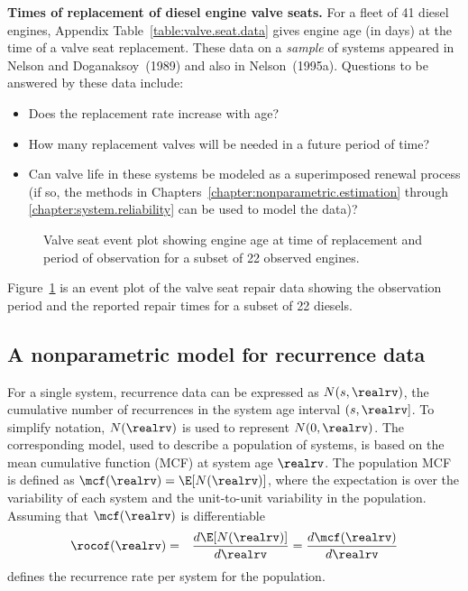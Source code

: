 \begin{example}
\label{example:valve.seat.data}
{\bf Times of replacement of diesel engine valve seats.}
For a fleet of 41 diesel engines,
Appendix Table~\ref{table:valve.seat.data} gives engine age
(in days) at the time of a valve seat replacement.
These data on a {\em sample} of systems appeared
in Nelson and Doganaksoy~(1989) and also in Nelson~(1995a).
Questions to be answered by these data include:
\begin{itemize}
\item
Does the replacement rate increase with age?
\item
How many replacement valves will be needed in a future period of time?
\item
Can valve life in these systems be modeled as a 
superimposed renewal process (if so,
the methods in Chapters~\ref{chapter:nonparametric.estimation}
through \ref{chapter:system.reliability} can be used to model the data)?
\end{itemize}
\begin{figure}
\caption{Valve seat event plot showing engine age at time of replacement
and period of observation for a subset of 22 observed engines.}
\label{figure:valveseat.event.plot.ps}
\end{figure}
Figure~\ref{figure:valveseat.event.plot.ps} is an event plot of the
valve seat repair data showing the observation period and the reported
repair times for a subset of 22 diesels.
\end{example}

\subsection{A nonparametric model for recurrence data}

For a single system, recurrence data can be expressed as
$N(s, \realrv)$, the cumulative number of 
recurrences in the system age interval $(s, \realrv]$. To simplify notation,
$N(\realrv)$ is used to represent $N(0,\realrv)$. 
The corresponding model, used to describe a population
of systems, is based on the mean cumulative function (MCF) at system age
$\realrv$. The population MCF is defined as 
$\mcf(\realrv)=\E[N(\realrv)]$, where the
expectation is over the variability of each system
and the unit-to-unit variability in the population.
Assuming that $\mcf(\realrv)$ is differentiable
\begin{eqnarray*}
\rocof(\realrv)
&=&\frac{d\E[N(\realrv)]}
		     {d \realrv}=\frac{
d \mcf(\realrv)
     }
     {
d \realrv
     }
\end{eqnarray*}
defines the recurrence rate per system for the
population. 


